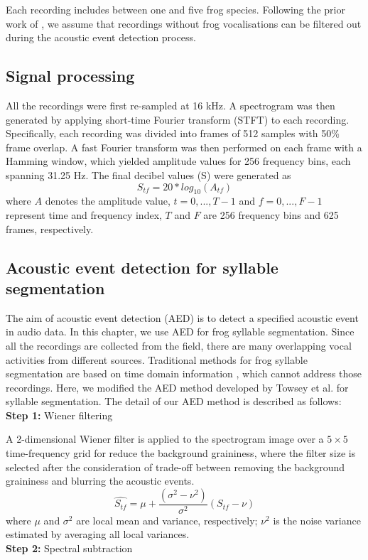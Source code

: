 Each recording includes between one and five frog species. Following the prior work of \citep{briggs2012acoustic}, we assume that recordings without frog vocalisations can be filtered out during the acoustic event detection process.


\subsection{Signal processing}
All the recordings were first re-sampled at 16 kHz. A spectrogram was then generated by applying short-time Fourier transform (STFT) to each recording. Specifically, each recording was
divided into frames of 512 samples with 50\% frame overlap.
A fast Fourier transform was then performed on each frame with a Hamming window, which yielded amplitude values for 256 frequency bins, each spanning 31.25 Hz. The final
decibel values (S) were generated as 
\begin{equation}
S_{tf} = 20*log_{10}(A_{tf})
\end{equation}
where $A$ denotes the amplitude value, $t=0,...,T-1$ and $f=0,...,F-1$ represent time and frequency index, $T$ and $F$ are 256 frequency bins and 625 frames, respectively. 

\subsection{Acoustic event detection for syllable segmentation}
\label{Ch5:AEDmethod}

The aim of acoustic event detection (AED) is to detect a specified acoustic event in audio data. In this chapter, we use AED for frog syllable segmentation. Since all the recordings are collected from the field, there are many overlapping vocal activities from different sources. Traditional methods for frog syllable segmentation are based on time domain information \citep{somervuo2004classification,huang2009frog}, which cannot address those recordings. Here, we modified the AED method developed by Towsey et al. \citep{towsey2012toolbox} for syllable segmentation. The detail of our AED method is described as follows:
\\
\textbf{Step 1:} Wiener filtering 

\noindent A 2-dimensional Wiener filter is applied to the spectrogram image over a $5 \times 5$ time-frequency grid for reduce the background graininess, where the filter size is selected after the consideration of trade-off between removing the background graininess and blurring the acoustic events.
\begin{equation}
\hat{S_{tf}} = \mu + \frac{(\sigma^{2}-\nu^{2})}{\sigma^{2}}(S_{tf}-\nu)
\end{equation}
where $\mu$ and $\sigma^{2}$ are local mean and variance, respectively; $\nu^{2}$ is the noise variance estimated by averaging all local variances. 
\\
\textbf{Step 2:} Spectral subtraction

